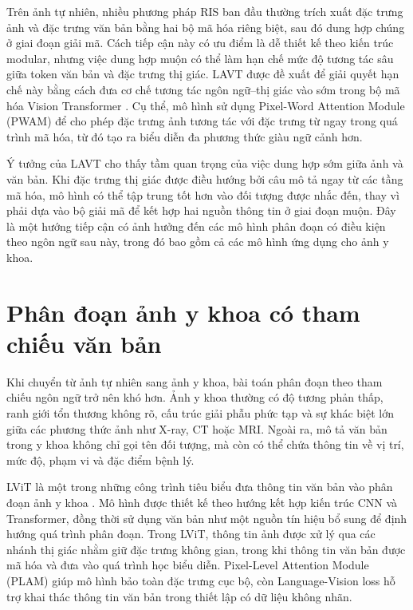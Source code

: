 Trên ảnh tự nhiên, nhiều phương pháp RIS ban đầu thường trích xuất đặc trưng ảnh và đặc trưng văn bản bằng hai bộ mã hóa riêng biệt, sau đó dung hợp chúng ở giai đoạn giải mã. Cách tiếp cận này có ưu điểm là dễ thiết kế theo kiến trúc modular, nhưng việc dung hợp muộn có thể làm hạn chế mức độ tương tác sâu giữa token văn bản và đặc trưng thị giác. LAVT được đề xuất để giải quyết hạn chế này bằng cách đưa cơ chế tương tác ngôn ngữ--thị giác vào sớm trong bộ mã hóa Vision Transformer \cite{yang_lavt_2021}. Cụ thể, mô hình sử dụng Pixel-Word Attention Module (PWAM) để cho phép đặc trưng ảnh tương tác với đặc trưng từ ngay trong quá trình mã hóa, từ đó tạo ra biểu diễn đa phương thức giàu ngữ cảnh hơn.

Ý tưởng của LAVT cho thấy tầm quan trọng của việc dung hợp sớm giữa ảnh và văn bản. Khi đặc trưng thị giác được điều hướng bởi câu mô tả ngay từ các tầng mã hóa, mô hình có thể tập trung tốt hơn vào đối tượng được nhắc đến, thay vì phải dựa vào bộ giải mã để kết hợp hai nguồn thông tin ở giai đoạn muộn. Đây là một hướng tiếp cận có ảnh hưởng đến các mô hình phân đoạn có điều kiện theo ngôn ngữ sau này, trong đó bao gồm cả các mô hình ứng dụng cho ảnh y khoa.

\section{Phân đoạn ảnh y khoa có tham chiếu văn bản}

Khi chuyển từ ảnh tự nhiên sang ảnh y khoa, bài toán phân đoạn theo tham chiếu ngôn ngữ trở nên khó hơn. Ảnh y khoa thường có độ tương phản thấp, ranh giới tổn thương không rõ, cấu trúc giải phẫu phức tạp và sự khác biệt lớn giữa các phương thức ảnh như X-ray, CT hoặc MRI. Ngoài ra, mô tả văn bản trong y khoa không chỉ gọi tên đối tượng, mà còn có thể chứa thông tin về vị trí, mức độ, phạm vi và đặc điểm bệnh lý.

LViT là một trong những công trình tiêu biểu đưa thông tin văn bản vào phân đoạn ảnh y khoa \cite{li_lvit_2023}. Mô hình được thiết kế theo hướng kết hợp kiến trúc CNN và Transformer, đồng thời sử dụng văn bản như một nguồn tín hiệu bổ sung để định hướng quá trình phân đoạn. Trong LViT, thông tin ảnh được xử lý qua các nhánh thị giác nhằm giữ đặc trưng không gian, trong khi thông tin văn bản được mã hóa và đưa vào quá trình học biểu diễn. Pixel-Level Attention Module (PLAM) giúp mô hình bảo toàn đặc trưng cục bộ, còn Language-Vision loss hỗ trợ khai thác thông tin văn bản trong thiết lập có dữ liệu không nhãn.

